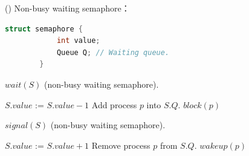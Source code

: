 \begin{theorem}{()} Non-busy waiting semaphore：
    \begin{lstlisting}[caption={Non-busy waiting semaphore.}, captionpos=b, language=C]
        struct semaphore {
            int value;
            Queue Q; // Waiting queue.
        }
    \end{lstlisting}
    \begin{algorithm}[H]
        \caption{$wait(S)$ (non-busy waiting semaphore).}
        \begin{algorithmic}[1]
                \State $S.value$ := $S.value - 1$
                    \State Add process $p$ into $S.Q$.
                    \State $block(p)$ 
                \EndIf
            \EndFunction
        \end{algorithmic}
    \end{algorithm}
    \begin{algorithm}[H]
        \caption{$signal(S)$ (non-busy waiting semaphore).}
        \begin{algorithmic}[1]
                \State $S.value$ := $S.value + 1$
                    \State Remove process $p$ from $S.Q$.
                    \State $wakeup(p)$ 
                \EndIf
            \EndFunction
        \end{algorithmic}
    \end{algorithm}
\end{theorem}

